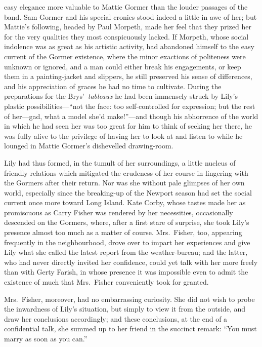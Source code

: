 \documentclass[12pt,a4paper]{book}
\begin{document}
easy elegance more valuable to Mattie Gormer than the louder
passages of the band. Sam Gormer and his special cronies stood
indeed a little in awe of her; but Mattie's following, headed by
Paul Morpeth, made her feel that they prized her for the very
qualities they most conspicuously lacked. If Morpeth, whose
social indolence was as great as his artistic activity, had
abandoned himself to the easy current of the Gormer existence,
where the minor exactions of politeness were unknown or ignored,
and a man could either break his engagements, or keep them in a
painting-jacket and slippers, he still preserved his sense of
differences, and his appreciation of graces he had no time to
cultivate. During the preparations for the Brys'\ \textit{tableaux} he had
been immensely struck by Lily's plastic possibilities---``not the
face: too self-controlled for expression; but the rest of
her---gad, what a model she'd make!''---and though his abhorrence of
the world in which he had seen her was too great for him to think
of seeking her there, he was fully alive to the privilege of
having her to look at and listen to while he lounged in Mattie
Gormer's dishevelled drawing-room.





Lily had thus formed, in the tumult of her surroundings, a little
nucleus of friendly relations which mitigated the crudeness of
her course in lingering with the Gormers after their return. Nor
was she without pale glimpses of her own world, especially since
the breaking-up of the Newport season had set the social current
once more toward Long Island. Kate Corby, whose tastes
made her as promiscuous as Carry Fisher was rendered by her
necessities, occasionally descended on the Gormers, where, after
a first stare of surprise, she took Lily's presence almost too
much as a matter of course. Mrs.\ Fisher, too, appearing
frequently in the neighbourhood, drove over to impart her
experiences and give Lily what she called the latest report from
the weather-bureau; and the latter, who had never directly
invited her confidence, could yet talk with her more freely than
with Gerty Farish, in whose presence it was impossible even to
admit the existence of much that Mrs.\ Fisher conveniently took
for granted.





Mrs.\ Fisher, moreover, had no embarrassing curiosity. She did not
wish to probe the inwardness of Lily's situation, but simply to
view it from the outside, and draw her conclusions accordingly;
and these conclusions, at the end of a confidential talk, she
summed up to her friend in the succinct remark: ``You must marry
as soon as you can.''
\end{document}
